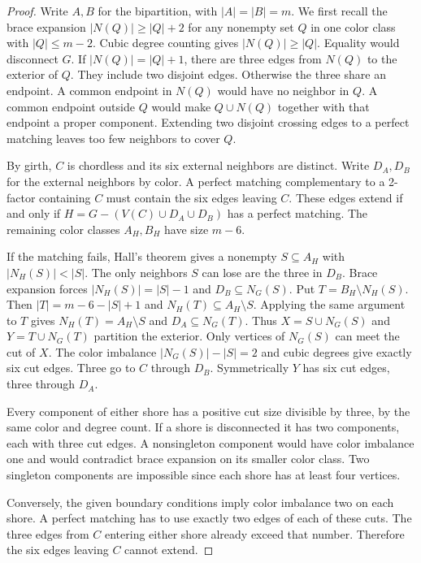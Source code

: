 \documentclass[11pt]{article}
\begin{document}
\begin{proof}
Write \(A,B\) for the bipartition, with \(\lvert A\rvert=\lvert B\rvert=m\).
We first recall the brace expansion
\(\lvert N(Q)\rvert\geq \lvert Q\rvert+2\) for any nonempty set \(Q\)
in one color class with \(\lvert Q\rvert\leq m-2\).
Cubic degree counting gives \(\lvert N(Q)\rvert\geq\lvert Q\rvert\).
Equality would disconnect \(G\). If \(\lvert N(Q)\rvert=\lvert Q\rvert+1\),
there are three edges from \(N(Q)\) to the exterior of \(Q\).
They include two disjoint edges. Otherwise the three share an
endpoint. A common endpoint in \(N(Q)\) would have no neighbor in \(Q\).
A common endpoint outside \(Q\) would make \(Q\cup N(Q)\) together with
that endpoint a proper component. Extending two disjoint crossing edges
to a perfect matching leaves too few neighbors to cover \(Q\).

By girth, \(C\) is chordless and its six external neighbors are
distinct. Write \(D_A,D_B\) for the external neighbors by color.
A perfect matching complementary to a 2-factor containing \(C\)
must contain the six edges leaving \(C\). These edges extend
if and only if \(H=G-(V(C)\cup D_A\cup D_B)\) has a perfect matching.
The remaining color classes \(A_H,B_H\) have size \(m-6\).

\newpage
If the matching fails, Hall's theorem gives a nonempty
\(S\subseteq A_H\) with \(\lvert N_H(S)\rvert<\lvert S\rvert\).
The only neighbors \(S\) can lose are the three in \(D_B\).
Brace expansion forces \(\lvert N_H(S)\rvert=\lvert S\rvert-1\)
and \(D_B\subseteq N_G(S)\).
Put \(T=B_H\setminus N_H(S)\). Then
\(\lvert T\rvert=m-6-\lvert S\rvert+1\) and
\(N_H(T)\subseteq A_H\setminus S\). Applying the same argument
to \(T\) gives \(N_H(T)=A_H\setminus S\) and \(D_A\subseteq N_G(T)\).
Thus \(X=S\cup N_G(S)\) and \(Y=T\cup N_G(T)\) partition the exterior.
Only vertices of \(N_G(S)\) can meet the cut of \(X\).
The color imbalance \(\lvert N_G(S)\rvert-\lvert S\rvert=2\)
and cubic degrees give exactly six cut edges. Three go to \(C\)
through \(D_B\). Symmetrically \(Y\) has six cut edges, three
through \(D_A\).

Every component of either shore has a positive cut size divisible
by three, by the same color and degree count. If a shore is
disconnected it has two components, each with three cut edges.
A nonsingleton component would have color imbalance one
and would contradict brace expansion on its smaller color class.
Two singleton components are impossible since each shore
has at least four vertices.

Conversely, the given boundary conditions imply color imbalance two
on each shore. A perfect matching has to use exactly two edges of
each of these cuts. The three edges from \(C\) entering either shore
already exceed that number. Therefore the six edges leaving \(C\)
cannot extend.
\end{proof}
\end{document}
